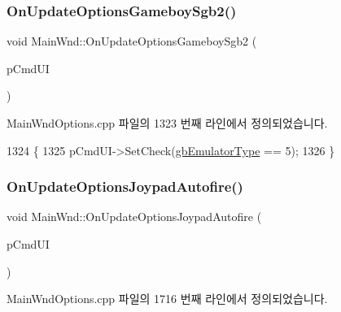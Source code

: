 \subsubsection{\texorpdfstring{On\+Update\+Options\+Gameboy\+Sgb2()}{OnUpdateOptionsGameboySgb2()}}
{\footnotesize\ttfamily void Main\+Wnd\+::\+On\+Update\+Options\+Gameboy\+Sgb2 (\begin{DoxyParamCaption}\item[{C\+Cmd\+UI $\ast$}]{p\+Cmd\+UI }\end{DoxyParamCaption})\hspace{0.3cm}{\ttfamily [protected]}}



Main\+Wnd\+Options.\+cpp 파일의 1323 번째 라인에서 정의되었습니다.


\begin{DoxyCode}
1324 \{
1325   pCmdUI->SetCheck(\mbox{\hyperlink{gb_globals_8cpp_aab449ed6ecf2bd502928a3d5aa5c54c4}{gbEmulatorType}} == 5);
1326 \}
\end{DoxyCode}
\mbox{\label{class_main_wnd_a3cb911708a00979763e000bed2023791}} 
\subsubsection{\texorpdfstring{On\+Update\+Options\+Joypad\+Autofire()}{OnUpdateOptionsJoypadAutofire()}}
{\footnotesize\ttfamily void Main\+Wnd\+::\+On\+Update\+Options\+Joypad\+Autofire (\begin{DoxyParamCaption}\item[{C\+Cmd\+UI $\ast$}]{p\+Cmd\+UI }\end{DoxyParamCaption})}



Main\+Wnd\+Options.\+cpp 파일의 1716 번째 라인에서 정의되었습니다.


